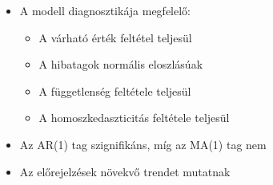 \documentclass[11pt]{article}
\providecommand{\tightlist}{%
      \setlength{\itemsep}{0pt}\setlength{\parskip}{0pt}}
\begin{document}
\begin{itemize}
\tightlist
\item
  A modell diagnosztikája megfelelő:

  \begin{itemize}
  \tightlist
  \item
    A várható érték feltétel teljesül
  \item
    A hibatagok normális eloszlásúak
  \item
    A függetlenség feltétele teljesül
  \item
    A homoszkedaszticitás feltétele teljesül
  \end{itemize}
\item
  Az AR(1) tag szignifikáns, míg az MA(1) tag nem
\item
  Az előrejelzések növekvő trendet mutatnak
\end{itemize}


    
    
    
\end{document}
